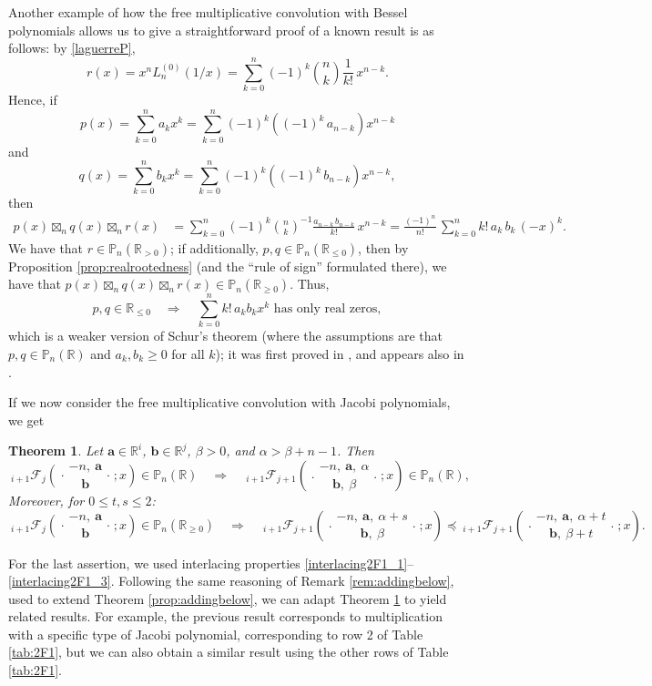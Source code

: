 \documentclass[reqno,11pt]{amsart}
\newtheorem{theorem}{Theorem}[section]
\theoremstyle{remark}
\renewcommand{\P}{\mathbb{P}}
\newcommand{\R}{\mathbb{R}}
\newcommand*\pFq[5]{%
 {\ }_{#1}{\mathcal F}_{#2}{\left(\genfrac..{0pt}{}{#3}{#4};#5\right)}%
}
\begin{document}
Another example of how the free multiplicative convolution with Bessel polynomials allows us to give a straightforward proof of a known result is as follows: by \eqref{laguerreP},
    $$
   r(x)= x^n L^{(0)}_{n}(1/x)= \sum_{k=0}^{n} (-1)^k \binom{n}{k} \frac{1}{k!}\,   x^{n-k}.
$$
Hence, if 
$$
p(x)= \sum_{k=0}^n a_k x^k= \sum_{k=0}^n (-1)^k \left( (-1)^k\, a_{n-k}\right) x^{n-k}
$$
and 
$$
q(x)= \sum_{k=0}^n b_k x^k= \sum_{k=0}^n (-1)^k \left( (-1)^k\, b_{n-k}\right) x^{n-k},
$$
then
\begin{align*}
    p(x) \boxtimes_n q(x) \boxtimes_n r(x) & =    \sum_{k=0}^n (-1)^k \binom{n}{k}^{-1} \frac{a_{n-k} \, b_{n-k}}{k!}\,   x^{n-k} 
   = \frac{(-1)^n}{n!}\, \sum_{k=0}^n    k!\,  a_{k} \, b_{k} \,   (-x)^{k}. 
\end{align*}
We have that $r\in \P_n(\R_{>0})$; if  additionally,  $p, q\in \P_n(\R_{\leq 0})$, then by Proposition \ref{prop:realrootedness} (and the ``rule of sign'' formulated there), we have that $p(x) \boxtimes_n q(x) \boxtimes_n r(x) \in \P_n(\R_{\ge 0})$. Thus,  
$$
p, q \in\R_{\leq 0} \quad  \Rightarrow \quad \sum_{k=0}^{n} k !\,  a_k b_k x^k \text{ has only real zeros},
$$
which is a weaker version of Schur's theorem (where the assumptions are that $p, q \in \P_n(\R)$  and $ a_k, b_k \ge  0$   for all $k$); it was first proved in \cite{schur1914zwei}, and appears also in \cite[Problems V.2.155-156]{polya1976problems}. 

\medskip 

If we now consider the free multiplicative convolution with Jacobi polynomials, we get
\begin{theorem}
    \label{prop:adding.above.below}
    Let $\bm a\in \R^i$, $\bm b \in \R^j$,  $\beta>0$, and $\alpha>\beta +n-1$. Then
    $$
    \pFq{i+1}{j}{-n,\ \bm a}{ \bm b}{x} \in \P_n(\R)
     \quad \Longrightarrow \quad 
    \pFq{i+1}{j+1}{-n,\ \bm a,\ \alpha}{ \bm b,\ \beta}{x} \in \P_n(\R),$$
Moreover, for $0\leq t,s\leq 2$:
$$ 
  \pFq{i+1}{j}{-n,\ \bm a}{ \bm b}{x} \in \P_n(\R_{\ge 0})
     \quad \Longrightarrow \quad 
     \pFq{i+1}{j+1}{-n,\ \bm a,\ \alpha+s}{ \bm b,\ \beta}{x} \preccurlyeq  \pFq{i+1}{j+1}{-n,\ \bm a,\ \alpha+t}{ \bm b,\ \beta+t}{x}.$$ 
\end{theorem}
For the last assertion, we used interlacing properties \eqref{interlacing2F1_1}--\eqref{interlacing2F1_3}. Following the same reasoning of Remark \ref{rem:addingbelow}, used to extend Theorem \ref{prop:addingbelow}, we can adapt Theorem \ref{prop:adding.above.below} to yield related results. For example, the previous result corresponds to multiplication with a specific type of Jacobi polynomial, corresponding to row 2 of Table \ref{tab:2F1}, but we can also obtain a similar result using the other rows of Table \ref{tab:2F1}.
\end{document}
